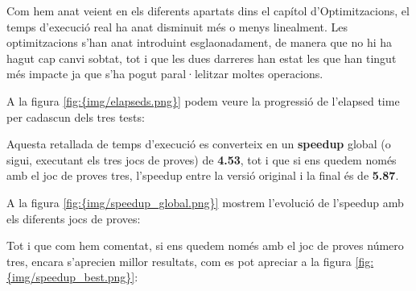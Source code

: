 
Com hem anat veient en els diferents apartats dins el capítol d'Optimitzacions, el temps d'execució real ha anat disminuit més o menys linealment. Les optimitzacions s'han anat introduint esglaonadament, de manera que no hi ha hagut cap canvi sobtat, tot i que les dues darreres han estat les que han tingut més impacte ja que s'ha pogut paral·lelitzar moltes operacions.

A la figura \ref{fig:{img/elapseds.png}} podem veure la progressió de l'elapsed time per cadascun dels tres tests:


Aquesta retallada de temps d'execució es converteix en un \textbf{speedup} global (o sigui, executant els tres jocs de proves) de \textbf{4.53}, tot i que si ens quedem només amb el joc de proves tres, l'speedup entre la versió original i la final és de \textbf{5.87}.

A la figura \ref{fig:{img/speedup_global.png}} mostrem l'evolució de l'speedup amb els diferents jocs de proves:


Tot i que com hem comentat, si ens quedem només amb el joc de proves número tres, encara s'aprecien millor resultats, com es pot apreciar a la figura \ref{fig:{img/speedup_best.png}}:

